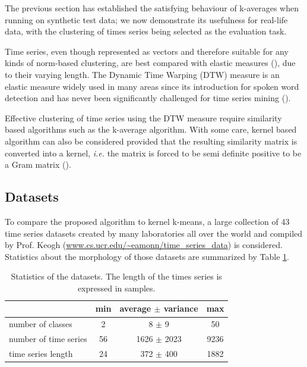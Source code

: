 \documentclass[a4paper,twoside]{article}
\begin{document}
The previous section has established the satisfying behaviour of k-averages when running on synthetic test data; we now demonstrate its usefulness for real-life data, with the clustering of times series being selected as the evaluation task.

Time series, even though represented as vectors and therefore suitable for any kinds of norm-based clustering, are best compared with elastic measures (\cite{Ding:2008:QMT:1454159.1454226, Wang:2013:ECR:2429736.2429754}), due to their varying length. The Dynamic Time Warping (DTW) measure is an elastic measure widely used in many areas since its introduction for spoken word detection \cite{1163055} and has never been significantly challenged for time series mining (\cite{conf/kdd/BerndtC94, Rakthanmanon:2013:ABD:2513092.2500489}).

Effective clustering of time series using the DTW measure require similarity based algorithms such as the k-average algorithm. With some care, kernel based algorithm can also be considered provided that the resulting similarity matrix is converted into a kernel, \textit{i.e.} the matrix is forced to be semi definite positive to be a Gram matrix (\cite{Lanckriet:2004:LKM:1005332.1005334}).

\subsection{Datasets}

To compare the proposed algorithm to kernel k-means, a large collection of 43 time series datasets created by many laboratories all over the world and compiled by Prof. Keogh (\url{www.cs.ucr.edu/~eamonn/time_series_data}) is considered.  Statistics about the morphology of those datasets are summarized by Table \ref{tab:dbs}.

\begin{table}
\center
\begin{tabular}{l|ccc}
& min & average $\pm$ variance & max \\
\hline
number of classes & 2 & 8 $\pm$ 9 & 50 \\
number of time series & 56 & 1626 $\pm$ 2023 & 9236 \\
time series length & 24 & 372 $\pm$ 400 & 1882 \\
\end{tabular}
\caption{\label{tab:dbs} Statistics of the datasets. The length of the times series is expressed in samples.}
\end{table}
\end{document}
